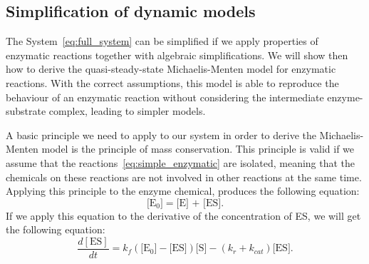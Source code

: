 \subsection{Simplification of dynamic models}
The System~\ref{eq:full_system} can be simplified if we
apply properties of enzymatic reactions together with algebraic 
simplifications. We will show then how to derive the quasi-steady-state 
Michaelis-Menten model for enzymatic reactions. With the correct 
assumptions, this model is able to reproduce the behaviour of an 
enzymatic reaction without considering the intermediate enzyme-substrate 
complex, leading to simpler models.

A basic principle we need to apply to our system in order to derive
the Michaelis-Menten model is the principle of mass conservation. This 
principle is valid if we assume that the 
reactions~\ref{eq:simple_enzymatic} are isolated, meaning that the 
chemicals on these reactions are not involved in other reactions at the
same time. Applying this principle to the enzyme chemical, produces the
following equation:
\begin{equation*}
    \text{[E$_0$]} = \text{[E] + [ES]}.
    \label{eq:E_conservation}
\end{equation*}
If we apply this equation to the derivative of the concentration of ES,
we will get the following equation:
\begin{equation}
    \frac{d[\text{ES}]}{dt} =  
        k_f(\text{[E$_0$]} - \text{[ES]})\text{[S]} 
        - (k_r + k_{cat}) \text{[ES]}. 
        \label{eq:dESdt_2}
\end{equation}

